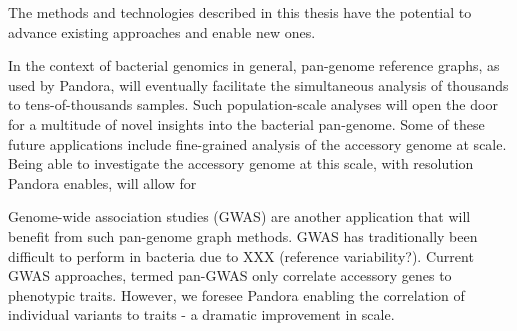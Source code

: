 



\noindent
The methods and technologies described in this thesis have the potential to advance existing approaches and enable new ones. 

In the context of bacterial genomics in general, pan-genome reference graphs, as used by Pandora, will eventually facilitate the simultaneous analysis of thousands to tens-of-thousands samples. Such population-scale analyses will open the door for a multitude of novel insights into the bacterial pan-genome. Some of these future applications include fine-grained analysis of the accessory genome at scale. Being able to investigate the accessory genome at this scale, with resolution Pandora enables, will allow for 


Genome-wide association studies (GWAS) are another application that will benefit from such pan-genome graph methods. GWAS has traditionally been difficult to perform in bacteria due to XXX (reference variability?). Current GWAS approaches, termed pan-GWAS only correlate accessory genes to phenotypic traits. However, we foresee Pandora enabling the correlation of individual variants to traits - a dramatic improvement in scale. 


